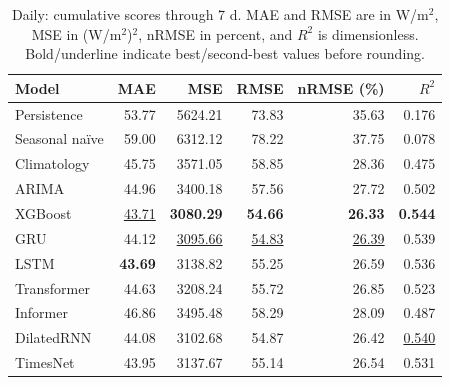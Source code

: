 \begin{table}[!htbp]
\centering
\small
\setlength{\tabcolsep}{6pt}
\caption{Daily: cumulative scores through 7 d. MAE and RMSE are in W/m$^2$, MSE in (W/m$^2$)$^2$, nRMSE in percent, and $R^2$ is dimensionless. Bold/underline indicate best/second-best values before rounding.}
\label{tab:baseline_daily_30_7}
\begin{tabular}{@{}lrrrrr@{}}
\toprule
Model & MAE & MSE & RMSE & nRMSE (\%) & $R^2$ \\
\midrule
Persistence & 53.77 & 5624.21 & 73.83 & 35.63 & 0.176 \\
Seasonal na\"ive & 59.00 & 6312.12 & 78.22 & 37.75 & 0.078 \\
Climatology & 45.75 & 3571.05 & 58.85 & 28.36 & 0.475 \\
ARIMA & 44.96 & 3400.18 & 57.56 & 27.72 & 0.502 \\
XGBoost & \underline{43.71} & \textbf{3080.29} & \textbf{54.66} & \textbf{26.33} & \textbf{0.544} \\
GRU & 44.12 & \underline{3095.66} & \underline{54.83} & \underline{26.39} & 0.539 \\
LSTM & \textbf{43.69} & 3138.82 & 55.25 & 26.59 & 0.536 \\
Transformer & 44.63 & 3208.24 & 55.72 & 26.85 & 0.523 \\
Informer & 46.86 & 3495.48 & 58.29 & 28.09 & 0.487 \\
DilatedRNN & 44.08 & 3102.68 & 54.87 & 26.42 & \underline{0.540} \\
TimesNet & 43.95 & 3137.67 & 55.14 & 26.54 & 0.531 \\
\bottomrule
\end{tabular}
\end{table}

